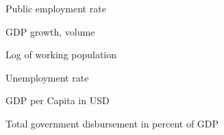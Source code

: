 \documentclass[a4paper, 10pt]{article}
\newcommand{\insertplot}[2]{
  \begin{figure}[!ht]
    \centering
    
    \caption{#2}
  \end{figure}
}
\begin{document}
%     
\begin{landscape}
  \insertplot{simple_model_quarterly_egr.tex}{Public employment rate}
  \insertplot{simple_model_quarterly_gdpv_annpct.tex}{GDP growth, volume}
  \insertplot{simple_model_quarterly_lpop_interpolated.tex}{Log of working population}
  \insertplot{simple_model_quarterly_unr.tex}{Unemployment rate}
  \insertplot{simple_model_quarterly_gdp_per_capita_interpolated.tex}{GDP per
    Capita in USD}
  \insertplot{simple_model_quarterly_ypgtq_interpolated.tex}{Total government disbursement in
    percent of GDP}
\end{landscape}
\end{document}
